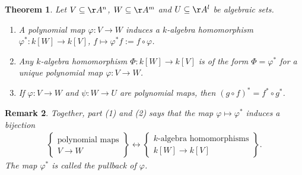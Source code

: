 \documentclass[12pt]{amsart}
\theoremstyle{plain}
\newtheorem{theorem}{Theorem}%
\newtheorem{remark}[theorem]{Remark}
\begin{document}
\begin{theorem}
Let $V \subseteq \AA^n$, $W \subseteq \AA^m$ and $U \subseteq \AA^l$ be algebraic sets.
\begin{enumerate}
\item
A polynomial map $\varphi:V \to W$ induces a $k$-algebra homomorphism $\varphi^*:k[W] \to k[V]$, $f \mapsto \varphi^*f := f \circ \varphi$.

\item
Any $k$-algebra homomorphism $\Phi:k[W] \to k[V]$ is of the form $\Phi = \varphi^*$ for a unique polynomial map $\varphi : V \to W$.

\item 
If $\varphi : V \to W$ and $\psi : W \to U$ are polynomial maps, then $(g \circ f)^* = f^* \circ g^*$.
\end{enumerate}
\end{theorem}
\begin{remark}
Together, part (1) and (2) says that the map $\varphi \mapsto \varphi^*$ induces a bijection
\begin{align*}\label{polynomialmapkalghombijection}
\left\{
\begin{array}{c}
	\text{polynomial maps} \\
	V \to W
\end{array}
\right\} \longleftrightarrow 
\left\{
\begin{array}{c}
	k\text{-algebra homomorphisms} \\
	k[W] \to k[V]
\end{array}
\right\}.
\end{align*}
The map $\varphi^*$ is called the pullback of $\varphi$.
\end{remark}
\end{document}
